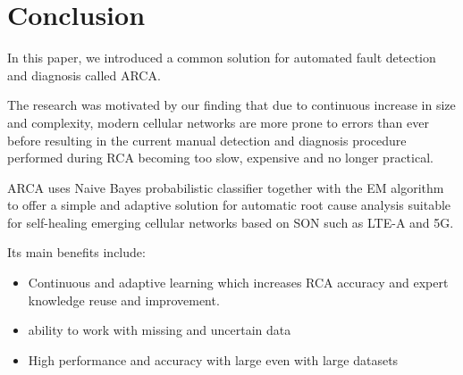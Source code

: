 \documentclass[conference]{IEEEtran}
\begin{document}
 
\section{Conclusion}
\label{sec:conclusion}
In this paper, we introduced a common solution for automated fault detection and diagnosis called ARCA. 

The research was motivated by our finding that due to continuous increase in size and complexity, modern cellular networks are more prone to errors than ever before resulting in the current  manual detection and diagnosis procedure performed during  RCA becoming too slow, expensive and no longer practical. 

ARCA uses Naive Bayes probabilistic classifier together with the EM algorithm to offer a simple and adaptive solution for automatic root cause analysis suitable for self-healing emerging cellular networks based on SON such as LTE-A and 5G.

Its main benefits include:
\begin{itemize}
\item Continuous and adaptive learning which increases RCA accuracy and expert knowledge reuse and improvement.
\item ability to work with missing and uncertain data
\item High performance and accuracy with large even with large datasets
\end{itemize}



\end{document}

